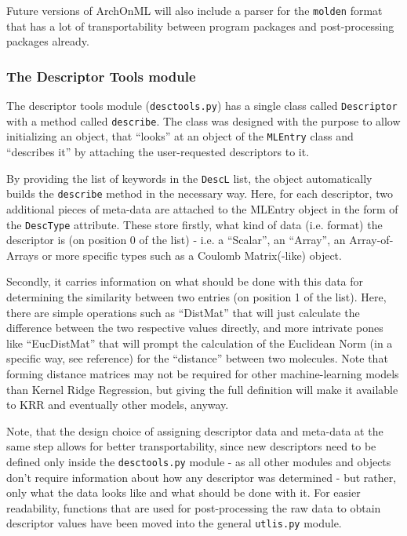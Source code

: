 \documentclass[12pt]{achemso}
\begin{document}
\noindent Future versions of ArchOnML will also include a parser for the \texttt{molden}\cite{Schaftenaar_2017} format that has a lot of transportability between program packages and post-processing packages already.

\subsubsection{The Descriptor Tools module}

\noindent The descriptor tools module (\texttt{desctools.py}) has a single class called \texttt{Descriptor} with a method called \texttt{describe}. The class was designed with the purpose to allow initializing an object, that ``looks'' at an object of the \texttt{MLEntry} class and ``describes it'' by attaching the user-requested descriptors to it.\\[-0.7em]

\vspace{1.0em}

\noindent By providing the list of keywords in the \texttt{DescL} list, the object automatically builds the \texttt{describe} method in the necessary way. Here, for each descriptor, two additional pieces of meta-data are attached to the MLEntry object in the form of the \texttt{DescType} attribute. These store firstly, what kind of data (i.e. format) the descriptor is (on position 0 of the list) - i.e. a ``Scalar'', an ``Array'', an Array-of-Arrays or more specific types such as a Coulomb Matrix(-like) object.

\noindent Secondly, it carries information on what should be done with this data for determining the similarity between two entries (on position 1 of the list). Here, there are simple operations such as ``DistMat'' that will just calculate the difference between the two respective values directly, and more intrivate pones like ``EucDistMat'' that will prompt the calculation of the Euclidean Norm (in a specific way, see reference\cite{Rupp2012}) for the ``distance'' between two molecules. Note that forming distance matrices may not be required for other machine-learning models than Kernel Ridge Regression, but giving the full definition will make it available to KRR and eventually other models, anyway.

\noindent Note, that the design choice of assigning descriptor data and meta-data at the same step allows for better transportability, since new descriptors need to be defined only inside the \verb+desctools.py+ module - as all other modules and objects don't require information about how any descriptor was determined - but rather, only what the data looks like and what should be done with it. For easier readability, functions that are used for post-processing the raw data to obtain descriptor values have been moved into the general \verb+utlis.py+ module.
\end{document}
